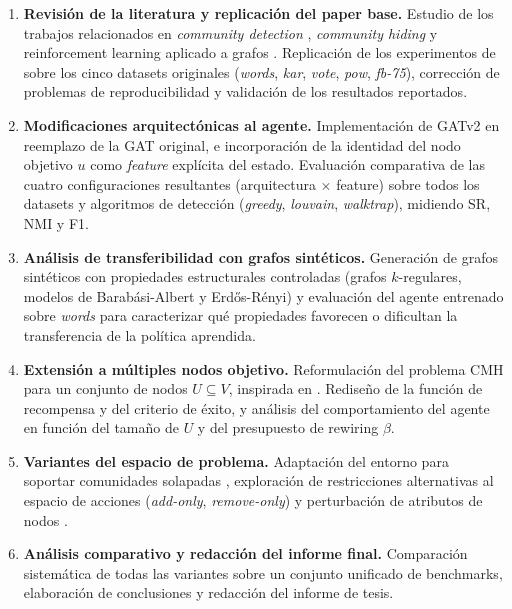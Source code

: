 \documentclass[11pt,a4paper]{article}
\begin{document}
\begin{enumerate}[leftmargin=*, label=\textbf{T\arabic*.}, itemsep=0.2ex]
    \item \textbf{Revisión de la literatura y replicación del paper base.}
    Estudio de los trabajos relacionados en \textit{community detection} \cite{Fortunato-2010, Su_2024}, \textit{community hiding} \cite{Waniek_2018, 8118127, 9377481} y reinforcement learning aplicado a grafos \cite{Chen_2022}.
    Replicación de los experimentos de \textcite{bernini-2024} sobre los cinco datasets originales (\textit{words}, \textit{kar}, \textit{vote}, \textit{pow}, \textit{fb-75}), corrección de problemas de reproducibilidad y validación de los resultados reportados.
    \item \textbf{Modificaciones arquitectónicas al agente.}
    Implementación de GATv2 \cite{brody2022attentivegraphattentionnetworks} en reemplazo de la GAT original, e incorporación de la identidad del nodo objetivo $u$ como \textit{feature} explícita del estado.
    Evaluación comparativa de las cuatro configuraciones resultantes (arquitectura $\times$ feature) sobre todos los datasets y algoritmos de detección (\textit{greedy}, \textit{louvain}, \textit{walktrap}), midiendo SR, NMI y F1.
    \item \textbf{Análisis de transferibilidad con grafos sintéticos.}
    Generación de grafos sintéticos con propiedades estructurales controladas (grafos $k$-regulares, modelos de Barabási-Albert y Erdős-Rényi) y evaluación del agente entrenado sobre \textit{words} para caracterizar qué propiedades favorecen o dificultan la transferencia de la política aprendida.
    \item \textbf{Extensión a múltiples nodos objetivo.}
    Reformulación del problema CMH para un conjunto de nodos $U \subseteq V$, inspirada en \textcite{8118127}.
    Rediseño de la función de recompensa y del criterio de éxito, y análisis del comportamiento del agente en función del tamaño de $U$ y del presupuesto de rewiring $\beta$.
    \item \textbf{Variantes del espacio de problema.}
    Adaptación del entorno para soportar comunidades solapadas \cite{Xie_2013}, exploración de restricciones alternativas al espacio de acciones (\textit{add-only}, \textit{remove-only}) y perturbación de atributos de nodos \cite{Yang_2013}.
    \item \textbf{Análisis comparativo y redacción del informe final.}
    Comparación sistemática de todas las variantes sobre un conjunto unificado de benchmarks, elaboración de conclusiones y redacción del informe de tesis.
\end{enumerate}

\begingroup
\tiny
\printbibliography[title={Referencias}]
\endgroup
\end{document}
